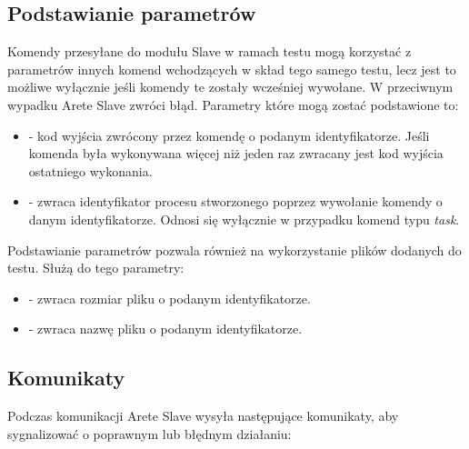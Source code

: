 \documentclass[00-praca-magisterska.tex]{subfiles}
\begin{document}
\subsection{Podstawianie parametrów}
\label{arete-slave-podst-param}

Komendy przesyłane do modułu Slave w ramach testu mogą korzystać z parametrów
innych komend wchodzących w skład tego samego testu, lecz jest to możliwe
wyłącznie jeśli komendy te zostały wcześniej wywołane. W przeciwnym wypadku
Arete Slave zwróci błąd. Parametry które mogą zostać podstawione to:

\begin{itemize}
  \setlength{\itemsep}{10pt}

\item{ - kod wyjścia zwrócony przez komendę
o podanym identyfikatorze. Jeśli komenda była wykonywana więcej niż jeden raz
zwracany jest kod wyjścia ostatniego wykonania.}

\item{ - zwraca identyfikator procesu stworzonego
poprzez wywołanie komendy o danym identyfikatorze. Odnosi się wyłącznie w
przypadku komend typu \emph{task}.}

\end{itemize}

Podstawianie parametrów pozwala również na wykorzystanie plików dodanych do
testu. Służą do tego parametry:

\begin{itemize}
  \setlength{\itemsep}{10pt}

\item{ - zwraca rozmiar pliku o podanym
identyfikatorze.}

\item{ - zwraca nazwę pliku o podanym
identyfikatorze.}

\end{itemize}

\subsection{Komunikaty}
\label{arete-slave-komunikaty}

Podczas komunikacji Arete Slave wysyła następujące komunikaty, aby
sygnalizować o poprawnym lub błędnym działaniu:
\end{document}
